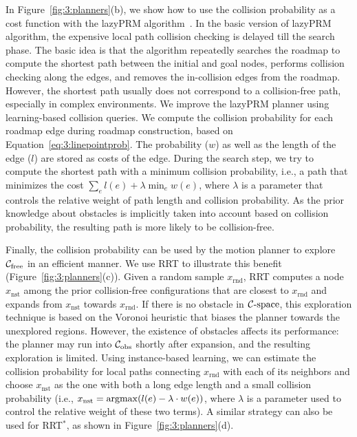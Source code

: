 In Figure~\ref{fig:3:planners}(b), we show how to use the collision probability as a cost function with the lazyPRM algorithm~\cite{Kavraki96}. In the basic version of lazyPRM algorithm, the expensive local path collision checking is delayed till the search phase. The basic idea is that the algorithm repeatedly searches the roadmap to compute the shortest path between the initial and goal nodes, performs collision checking along the edges, and removes the in-collision edges from the roadmap. However, the shortest path usually does not correspond to a collision-free path, especially in complex environments. We improve the lazyPRM planner using learning-based collision queries. We compute the collision probability for each roadmap edge during roadmap construction, based on Equation~\ref{eq:3:linepointprob}. The probability ($w$) as well as the length of the edge ($l$) are stored as costs of the edge. During the search step, we try to compute the shortest path with a minimum collision probability, i.e., a path that minimizes the cost $\sum_{e} l(e) + \lambda \min_{e} w(e)$, where $\lambda$ is a parameter that controls the relative weight of path length and collision probability. As the prior knowledge about obstacles is implicitly taken into account based on collision probability, the resulting path is more likely to be collision-free.

Finally, the collision probability can be used by the motion planner to explore $\mathcal C_{\text{free}}$ in an efficient manner. We use RRT to illustrate this benefit (Figure~\ref{fig:3:planners}(c)). Given a random sample $x_{\text{rnd}}$, RRT computes a node $x_{\text{nst}}$ among the prior collision-free configurations that are closest to $x_{\text{rnd}}$ and expands from $x_{\text{nst}}$ towards $x_{\text{rnd}}$. If there is no obstacle in $\mathcal C\text{-space}$, this exploration technique is based on the Voronoi heuristic that biases the planner towards the unexplored regions. However, the existence of obstacles affects its performance: the planner may run into $\mathcal C_{\text{obs}}$ shortly after expansion, and the resulting exploration is limited. Using instance-based learning, we can estimate the collision probability for local paths connecting $x_{\text{rnd}}$ with each of its neighbors and choose $x_{\text{nst}}$ as the one with both a long edge length and a small collision probability (i.e., $x_{\text{nst}} = \operatorname{argmax}(l(e) - \lambda \cdot w(e))$, where $\lambda$ is a parameter used to control the relative weight of these two terms). A similar strategy can also be used for RRT${}^*$, as shown in Figure~\ref{fig:3:planners}(d).




